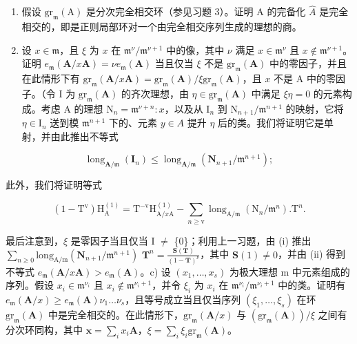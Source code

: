 \begin{enumerate}
\def\labelenumi{\alph{enumi})}
\item
  假设 \(\mathrm{gr}_{\mathfrak{m}}(\mathrm{A})\) 是分次完全相交环（参见习题 3）。证明 A 的完备化 \(\widehat{A}\) 是完全相交的，即是正则局部环对一个由完全相交序列生成的理想的商。
\item
  设 \(x \in \mathfrak{m}\)，且 \(\xi\) 为 \(x\) 在 \(\mathfrak{m}^{\nu}/\mathfrak{m}^{\nu+1}\) 中的像，其中 \(\nu\) 满足 \(x \in \mathfrak{m}^{\nu}\) 且 \(x \notin \mathfrak{m}^{\nu+1}\)。证明 \(e_{\mathfrak{m}}(\mathbf{A}/x\mathbf{A}) = \nu e_{\mathfrak{m}}(\mathbf{A})\) 当且仅当 \(\xi\) 不是 \(\mathrm{gr}_{\mathfrak{m}}(\mathbf{A})\) 中的零因子，并且在此情形下有 \(\mathrm{gr}_{\mathfrak{m}}(\mathbf{A}/x\mathbf{A}) = \mathrm{gr}_{\mathfrak{m}}(\mathbf{A})/\xi\mathrm{gr}_{\mathfrak{m}}(\mathbf{A})\)，且 \(x\) 不是 A 中的零因子。（令 I 为 \(\mathrm{gr}_{\mathfrak{m}}(\mathbf{A})\) 的齐次理想，由 \(\eta \in \mathrm{gr}_{\mathfrak{m}}(\mathbf{A})\) 中满足 \(\xi\eta = 0\) 的元素构成。考虑 A 的理想 \(\mathrm{N}_n = \mathfrak{m}^{\nu+n}:x\)，以及从 \(\mathrm{I}_n\) 到 \(\mathrm{N}_{n+1}/\mathfrak{m}^{n+1}\) 的映射，它将 \(\eta \in \mathrm{I}_n\) 送到模 \(\mathfrak{m}^{n+1}\) 下的、元素 \(y \in A\) 提升 \(\eta\) 后的类。我们将证明它是单射，并由此推出不等式
\end{enumerate}

\[
\operatorname{long} _ {\mathbf {A} / \mathfrak {m}} (\mathbf {I} _ {n}) \leqslant \operatorname{long} _ {\mathbf {A} / \mathfrak {m}} (\mathbf {N} _ {n + 1} / \mathfrak {m} ^ {n + 1});\tag{i}
\]

此外，我们将证明等式

\[
(1 - \mathrm{T} ^ {\mathrm{v}}) \mathrm{H} _ {\mathrm{A}} ^ {(1)} = \mathrm{T} ^ {- \mathrm{v}} \mathrm{H} _ {\mathrm{A} / x \mathrm{A}} ^ {(1)} - \sum_ {n \geqslant \mathrm{v}} \operatorname{long} _ {\mathrm{A} / \mathfrak {m}} (\mathrm{N} _ {n} / \mathfrak {m} ^ {n}). \mathrm{T} ^ {n}.\tag{ii}
\]

最后注意到，\(\xi\) 是零因子当且仅当 I \(\neq\) \{0\}；利用上一习题，由 (i) 推出 \(\sum_{n\geqslant 0}\mathrm{long}_{\mathrm{A / m}}(\mathbf{N}_{n + 1} / \mathfrak{m}^{n + 1})\) \(\mathbf{T}^n = \frac{\mathbf{S}(\mathbf{T})}{(1 - \mathbf{T})^\nu}\)，其中 \(\mathbf{S}(1)\neq 0\)，并由 (ii) 得到不等式 \(e_{\mathfrak{m}}(\mathbf{A} / x\mathbf{A}) > e_{\mathfrak{m}}(\mathbf{A})\)。c) 设 \((x_{1},\dots,x_{s})\) 为极大理想 m 中元素组成的序列。假设 \(x_{i}\in \mathfrak{m}^{\nu_i}\) 且 \(x_{i}\notin \mathfrak{m}^{\nu_i + 1}\)，并令 \(\xi_{i}\) 为 \(x_{i}\) 在 \(\mathfrak{m}^{\nu_i} / \mathfrak{m}^{\nu_i + 1}\) 中的类。证明有 \(e_{\mathfrak{m}}(\mathbf{A} / x)\geqslant e_{\mathfrak{m}}(\mathbf{A})\nu_{1}\dots \nu_{s}\)，且等号成立当且仅当序列 \((\xi_1,\dots,\xi_s)\) 在环 \(\mathrm{gr}_{\mathfrak{m}}(\mathbf{A})\) 中是完全相交的。在此情形下，\(\mathrm{gr}_{\mathfrak{m}}(\mathbf{A} / x)\) 与 \((\mathrm{gr}_{\mathfrak{m}}(\mathbf{A}))/\xi\) 之间有分次环同构，其中 \(\mathbf{x} = \sum_{i}x_{i}\mathbf{A}\)，\(\xi = \sum_{i}\xi_{i}\mathrm{gr}_{\mathfrak{m}}(\mathbf{A})\)。

